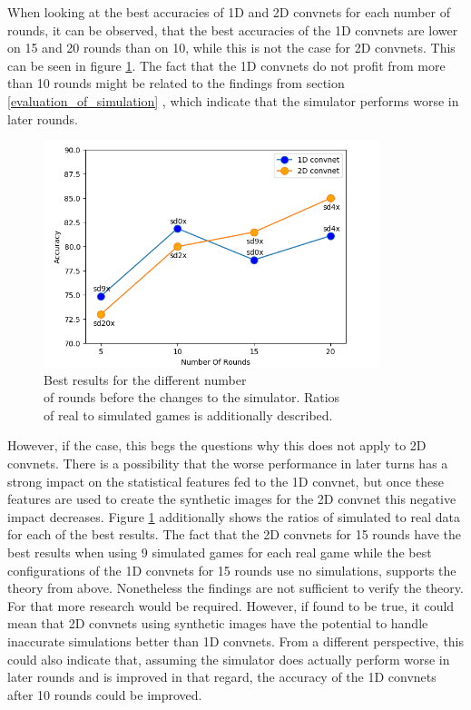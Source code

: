 \begin{minipage}[c]{0.4\textwidth}
	When looking at the best accuracies of 1D and 2D convnets for each number of rounds, it can be observed, that the best accuracies of the 1D convnets are lower on 15 and 20 rounds than on 10, while this is not the case for 2D convnets. This can be seen in figure \ref{fig:bestAccPlot}. The fact that the 1D convnets do not profit from more than 10 rounds might be related to the findings from section \ref{evaluation_of_simulation} , which indicate that the simulator performs worse in later rounds.
\end{minipage}
\begin{minipage}[c]{0.6\textwidth}
	\begin{figure}[H]
		\centering
		\includegraphics[width=9.8cm]{images/bestAccPlotNew.png}
		\caption[Best results for the different number of rounds before the changes to the simulator.]{Best results for the different number\\\hspace{0\textheight} of rounds before the changes to the simulator. Ratios\\\hspace{0\textheight} of real to simulated games is additionally described.}
		\label{fig:bestAccPlot}
	\end{figure}
\end{minipage}

 However, if the case, this begs the questions why this does not apply to 2D convnets. There is a possibility that the worse performance in later turns has a strong impact on the statistical features fed to the 1D convnet, but once these features are used to create the synthetic images for the 2D convnet this negative impact decreases. Figure \ref{fig:bestAccPlot} additionally shows the ratios of simulated to real data for each of the best results. The fact that the 2D convnets for 15 rounds have the best results when using 9 simulated games for each real game while the best configurations of the 1D convnets for 15 rounds use no simulations, supports the theory from above. Nonetheless the findings are not sufficient to verify the theory. For that more research would be required. However, if found to be true, it could mean that 2D convnets using synthetic images have the potential to handle inaccurate simulations better than 1D convnets. From a different perspective, this could also indicate that, assuming the simulator does actually perform worse in later rounds and is improved in that regard, the accuracy of the 1D convnets after 10 rounds could be improved.


